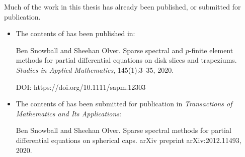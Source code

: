 
\cleardoublepage
{}

\begin{foreword}

Much of the work in this thesis has already been published, or submitted for publication.

\begin{itemize}

\item The contents of  has been published in:

Ben Snowball and Sheehan Olver. Sparse spectral and $p$-finite element methods for partial differential equations on disk slices and trapeziums. \textit{Studies in Applied Mathematics}, 145(1):3--35, 2020. 

DOI: https://doi.org/10.1111/sapm.12303

\item The contents of  has been submitted for publication in \textit{Transactions of Mathematics and Its Applications}:

Ben Snowball and Sheehan Olver. Sparse spectral methods for partial differential equations on spherical caps. arXiv preprint arXiv:2012.11493, 2020.

\end{itemize}

\end{foreword}
